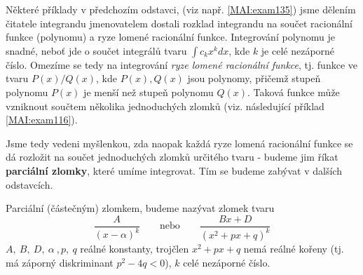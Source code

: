       
      
    \newpage
      Některé příklady v předchozím odstavci, (viz např. \ref{MAI:exam135}) jsme dělením čitatele
      integrandu jmenovatelem dostali rozklad integrandu na součet racionální funkce (polynomu) a
      ryze lomené racionální funkce. Integrování polynomu je snadné, neboť jde o součet integrálů
      tvaru $\int c_kx^k dx$, kde $k$ je celé nezáporné číslo. Omezíme se tedy na integrování
      \emph{ryze lomené racionální funkce},  tj. funkce ve tvaru $P(x)/Q(x)$, kde $P(x), Q(x)$ jsou
      polynomy, přičemž stupeň polynomu $P(x)$ je menší než stupeň polynomu $Q(x)$. Taková funkce
      může vzniknout součtem několika jednoduchých zlomků (viz. následující příklad
      \ref{MAI:exam116}).
      
      
      
      Jsme tedy vedeni myšlenkou, zda naopak každá ryze lomená racionální funkce se dá rozložit
      na součet jednoduchých zlomků určitého tvaru - budeme jim říkat \textbf{parciální zlomky},
      které umíme integrovat. Tím se budeme zabývat v dalších odstavcích. 
    
      
      
      \begin{mdframed}[style=mdmathdef] 
        \begin{definition}\label{mai:def003}
          Parciální (částečným) zlomkem, budeme nazývat zlomek tvaru
          \begin{equation}\label{mai:eq168}
            \frac{A}{(x-\alpha)^k} \qquad\text{nebo}\qquad\frac{Bx + D}{(x^2 + px + q)^k}
          \end{equation}  
          $A,\ B,\ D,\ \alpha\ , p,\ q$ reálné konstanty, trojčlen \(x^2 + px + q\) nemá reálné
          kořeny (tj. má záporný diskriminant $p^2-4q < 0$), $k$ celé nezáporné číslo.         
        \end{definition}
      \end{mdframed}    
      
